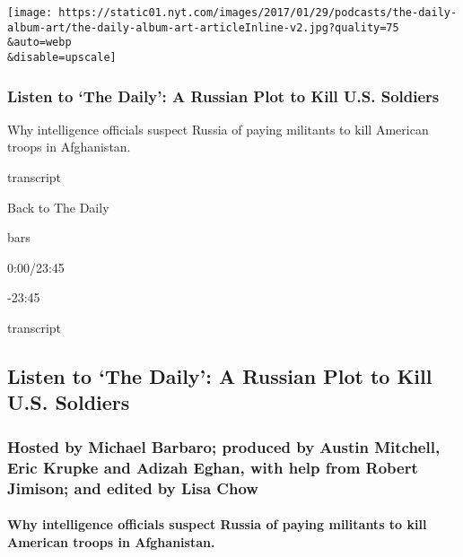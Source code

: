 \texttt{[image: https://static01.nyt.com/images/2017/01/29/podcasts/the-daily-album-art/the-daily-album-art-articleInline-v2.jpg?quality=75\\\&auto=webp\\\&disable=upscale]}

\hypertarget{listen-to-the-daily-a-russian-plot-to-kill-us-soldiers}{%
\subsubsection{Listen to `The Daily': A Russian Plot to Kill U.S.
Soldiers}\label{listen-to-the-daily-a-russian-plot-to-kill-us-soldiers}}

Why intelligence officials suspect Russia of paying militants to kill
American troops in Afghanistan.

transcript

Back to The Daily

bars

0:00/23:45

-23:45

transcript

\hypertarget{listen-to-the-daily-a-russian-plot-to-kill-us-soldiers-1}{%
\subsection{Listen to `The Daily': A Russian Plot to Kill U.S.
Soldiers}\label{listen-to-the-daily-a-russian-plot-to-kill-us-soldiers-1}}

\hypertarget{hosted-by-michael-barbaro-produced-by-austin-mitchell-eric-krupke-and-adizah-eghan-with-help-from-robert-jimison-and-edited-by-lisa-chow}{%
\subsubsection{Hosted by Michael Barbaro; produced by Austin Mitchell,
Eric Krupke and Adizah Eghan, with help from Robert Jimison; and edited
by Lisa
Chow}\label{hosted-by-michael-barbaro-produced-by-austin-mitchell-eric-krupke-and-adizah-eghan-with-help-from-robert-jimison-and-edited-by-lisa-chow}}

\hypertarget{why-intelligence-officials-suspect-russia-of-paying-militants-to-kill-american-troops-in-afghanistan}{%
\paragraph{Why intelligence officials suspect Russia of paying militants
to kill American troops in
Afghanistan.}\label{why-intelligence-officials-suspect-russia-of-paying-militants-to-kill-american-troops-in-afghanistan}}

